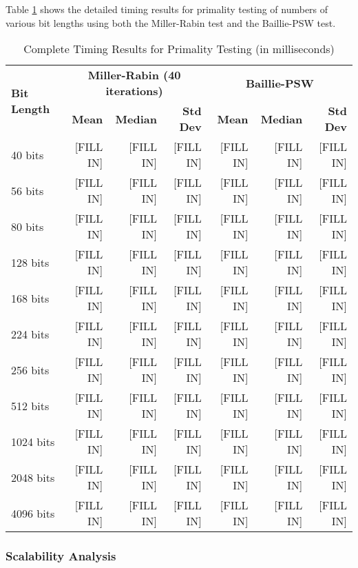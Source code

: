 Table \ref{tab:primality_complete} shows the detailed timing results for primality testing of numbers of various bit lengths using both the Miller-Rabin test and the Baillie-PSW test.

\begin{table}[H]
\centering
\caption{Complete Timing Results for Primality Testing (in milliseconds)}
\label{tab:primality_complete}
\begin{tabular}{@{}lrrrrrr@{}}
\toprule
\multirow{2}{*}{\textbf{Bit Length}} & \multicolumn{3}{c}{\textbf{Miller-Rabin (40 iterations)}} & \multicolumn{3}{c}{\textbf{Baillie-PSW}} \\
\cmidrule(lr){2-4} \cmidrule(lr){5-7}
& \textbf{Mean} & \textbf{Median} & \textbf{Std Dev} & \textbf{Mean} & \textbf{Median} & \textbf{Std Dev} \\
\midrule
40 bits     & [FILL IN] & [FILL IN] & [FILL IN] & [FILL IN] & [FILL IN] & [FILL IN] \\
56 bits     & [FILL IN] & [FILL IN] & [FILL IN] & [FILL IN] & [FILL IN] & [FILL IN] \\
80 bits     & [FILL IN] & [FILL IN] & [FILL IN] & [FILL IN] & [FILL IN] & [FILL IN] \\
128 bits    & [FILL IN] & [FILL IN] & [FILL IN] & [FILL IN] & [FILL IN] & [FILL IN] \\
168 bits    & [FILL IN] & [FILL IN] & [FILL IN] & [FILL IN] & [FILL IN] & [FILL IN] \\
224 bits    & [FILL IN] & [FILL IN] & [FILL IN] & [FILL IN] & [FILL IN] & [FILL IN] \\
256 bits    & [FILL IN] & [FILL IN] & [FILL IN] & [FILL IN] & [FILL IN] & [FILL IN] \\
512 bits    & [FILL IN] & [FILL IN] & [FILL IN] & [FILL IN] & [FILL IN] & [FILL IN] \\
1024 bits   & [FILL IN] & [FILL IN] & [FILL IN] & [FILL IN] & [FILL IN] & [FILL IN] \\
2048 bits   & [FILL IN] & [FILL IN] & [FILL IN] & [FILL IN] & [FILL IN] & [FILL IN] \\
4096 bits   & [FILL IN] & [FILL IN] & [FILL IN] & [FILL IN] & [FILL IN] & [FILL IN] \\
\bottomrule
\end{tabular}
\end{table}

\subsubsection{Scalability Analysis}

